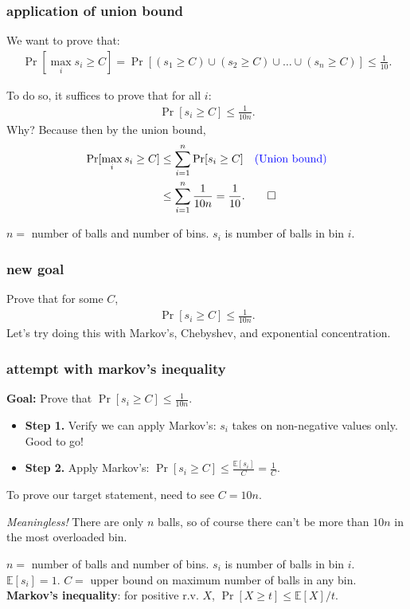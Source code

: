 \documentclass[compress]{beamer}
\newcommand{\blue}[1]{\textcolor{blue}{#1}}
\newcommand{\E}{\mathbb{E}}
\begin{document}
\begin{frame}
	\frametitle{application of union bound}
	We want to prove that:
	\begin{align*}
		\Pr[\max_i s_i \geq C] = \Pr[(s_1 \geq C) \cup (s_2 \geq C) \cup \ldots \cup (s_n \geq C)] \leq \frac{1}{10}. 
	\end{align*}
	
	\alert{To do so, it suffices to prove that for all $i$:
		\begin{align*}
			\Pr[s_i \geq C] \leq \frac{1}{10n}. 
	\end{align*}}
	Why? Because then by the union bound, 
	\begin{align*}
		\Pr[\max_i s_i \geq C] &\leq \sum_{i=1}^n \Pr[s_i \geq C] \text{\hspace{1em}\blue{(Union bound)}}\\
		&\leq \sum_{i=1}^n \frac{1}{10n} = \frac{1}{10}. \qed
	\end{align*}
	

	\begin{block}{\vspace*{-3ex}}
		\small $n = $ number of balls and number of bins. $s_i$ is number of balls in bin $i$.
	\end{block}
\end{frame}

\begin{frame}
	\frametitle{new goal}
	Prove that for some $C$, 
	\begin{align*}
		\Pr[s_i \geq C] \leq \frac{1}{10n}. 
	\end{align*}
	Let's try doing this with Markov's, Chebyshev, and exponential concentration.
\end{frame}


\begin{frame}
	\frametitle{attempt with markov's inequality}
	\vspace{1em}
	\textbf{Goal:} Prove that $\Pr[s_i \geq C] \leq \frac{1}{10n}$. 
	\begin{itemize}
		\item \textbf{Step 1.} Verify we can apply Markov's: $s_i$ takes on non-negative values only. Good to go!
		\item \textbf{Step 2.} Apply Markov's: $\Pr[s_i \geq C] \leq \frac{\E[s_i]}{C} = \frac{1}{C}$. 
	\end{itemize}
	To prove our target statement, need to see $C = 10n$. 
	
	\emph{Meaningless!} There are only $n$ balls, so of course there can't be more than $10n$ in the most overloaded bin. 
	
	\vspace{2em}
	\begin{block}{\vspace*{-3ex}}
		\small $n = $ number of balls and number of bins. $s_i$ is number of balls in bin $i$. $\E[s_i] = 1$. $C =$ upper bound on maximum number of balls in any bin. \textbf{Markov's inequality}: for positive r.v. $X$, $\Pr[X \geq t] \leq \E[X]/t$.  
	\end{block}
\end{frame}
\end{document}
